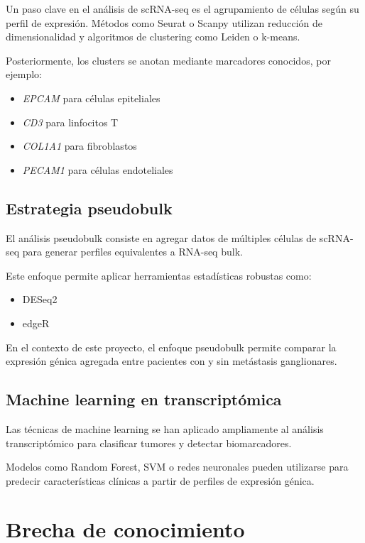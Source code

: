 \documentclass[11pt]{article}
\begin{document}
Un paso clave en el análisis de scRNA-seq es el agrupamiento de células según su perfil de expresión. Métodos como Seurat o Scanpy utilizan reducción de dimensionalidad y algoritmos de clustering como Leiden o k-means.

Posteriormente, los clusters se anotan mediante marcadores conocidos, por ejemplo:

\begin{itemize}
\item \textit{EPCAM} para células epiteliales
\item \textit{CD3} para linfocitos T
\item \textit{COL1A1} para fibroblastos
\item \textit{PECAM1} para células endoteliales
\end{itemize}

\subsection{Estrategia pseudobulk}

El análisis pseudobulk consiste en agregar datos de múltiples células de scRNA-seq para generar perfiles equivalentes a RNA-seq bulk.

Este enfoque permite aplicar herramientas estadísticas robustas como:

\begin{itemize}
\item DESeq2
\item edgeR
\end{itemize}

En el contexto de este proyecto, el enfoque pseudobulk permite comparar la expresión génica agregada entre pacientes con y sin metástasis ganglionares.

\subsection{Machine learning en transcriptómica}

Las técnicas de machine learning se han aplicado ampliamente al análisis transcriptómico para clasificar tumores y detectar biomarcadores.

Modelos como Random Forest, SVM o redes neuronales pueden utilizarse para predecir características clínicas a partir de perfiles de expresión génica.

\section{Brecha de conocimiento}
\end{document}
